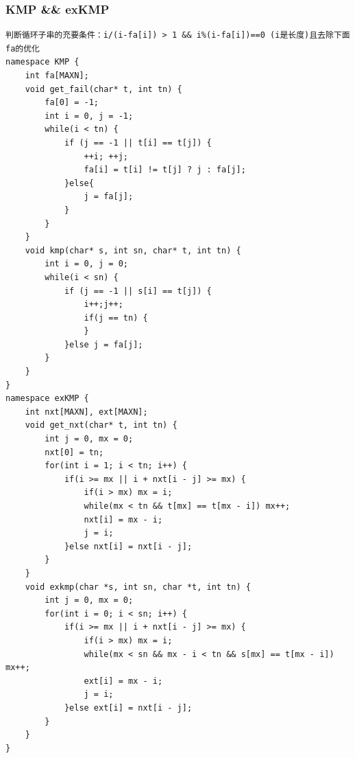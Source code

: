 \documentclass[10pt]{ctexart}
\begin{document}
{\subsubsection{KMP \&\& exKMP}
\begin{lstlisting}
判断循环子串的充要条件：i/(i-fa[i]) > 1 && i%(i-fa[i])==0 (i是长度)且去除下面fa的优化
namespace KMP {
	int fa[MAXN];
	void get_fail(char* t, int tn) {
		fa[0] = -1;
		int i = 0, j = -1;
		while(i < tn) {
			if (j == -1 || t[i] == t[j]) {  
				++i; ++j;
				fa[i] = t[i] != t[j] ? j : fa[j];  
			}else{  
				j = fa[j];  
			}  
		}
	}
	void kmp(char* s, int sn, char* t, int tn) {
		int i = 0, j = 0;
		while(i < sn) {
			if (j == -1 || s[i] == t[j]) {
				i++;j++;
				if(j == tn) {
				}
			}else j = fa[j];
		}
	}
}
namespace exKMP {
	int nxt[MAXN], ext[MAXN];
	void get_nxt(char* t, int tn) {
		int j = 0, mx = 0;
		nxt[0] = tn;
		for(int i = 1; i < tn; i++) {
			if(i >= mx || i + nxt[i - j] >= mx) {
				if(i > mx) mx = i;
				while(mx < tn && t[mx] == t[mx - i]) mx++;
				nxt[i] = mx - i;
				j = i;
			}else nxt[i] = nxt[i - j];
		}
	}
	void exkmp(char *s, int sn, char *t, int tn) {
		int j = 0, mx = 0;
		for(int i = 0; i < sn; i++) {
			if(i >= mx || i + nxt[i - j] >= mx) {
				if(i > mx) mx = i;
				while(mx < sn && mx - i < tn && s[mx] == t[mx - i]) mx++;
				ext[i] = mx - i;
				j = i;
			}else ext[i] = nxt[i - j];
		}
	}
}
\end{lstlisting}
}
\end{document}
